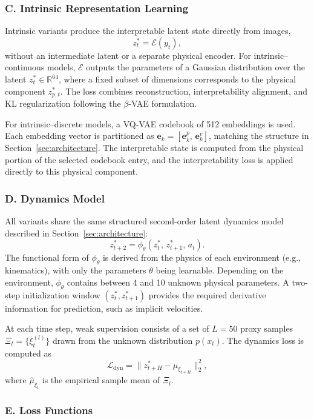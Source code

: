 \documentclass[nonacm,sigconf]{acmart}
\begin{document}
\subsubsection*{C. Intrinsic Representation Learning}

Intrinsic variants produce the interpretable latent state directly from images,
\[
z^*_t = \mathcal{E}(y_t),
\]
without an intermediate latent or a separate physical encoder.  
For intrinsic--continuous models, $\mathcal{E}$ outputs the parameters of a
Gaussian distribution over the latent $z^*_t \in \mathbb{R}^{64}$, where a fixed
subset of dimensions corresponds to the physical component $z^{*}_{p,t}$.  
The loss combines reconstruction, interpretability alignment, and KL
regularization following the $\beta$-VAE formulation.

For intrinsic--discrete models, a VQ-VAE codebook of 512 embeddings is used.
Each embedding vector is partitioned as
$\mathbf{e}_k = [\mathbf{e}^{p}_k,\, \mathbf{e}^{v}_k]$, matching the structure
in Section~\ref{sec:architecture}. The interpretable state is computed from the
physical portion of the selected codebook entry, and the interpretability loss is
applied directly to this physical component.

\subsubsection*{D. Dynamics Model}

All variants share the same structured second-order latent dynamics model
described in Section~\ref{sec:architecture}:
\[
z^{*}_{t+2} = \phi_\theta(z^{*}_{t},\, z^{*}_{t+1},\, a_t).
\]
The functional form of $\phi_\theta$ is derived from the physics of each
environment (e.g., kinematics), with only the parameters $\theta$ being
learnable. Depending on the environment, $\phi_\theta$ contains between 4 and 10
unknown physical parameters. A two-step initialization window
$(z^*_t, z^*_{t+1})$ provides the required derivative information for
prediction, such as implicit velocities.  

At each time step, weak supervision consists of a set of $L = 50$ proxy samples
$\Xi_t = \{\xi^{(l)}_t\}$ drawn from the unknown distribution $p(x_t)$. The
dynamics loss is computed as
\[
\mathcal{L}_{\text{dyn}} = 
\| z^{*}_{t+H} - \hat{\mu}_{\xi_{t+H}} \|_2^2,
\]
where $\hat{\mu}_{\xi_t}$ is the empirical sample mean of $\Xi_t$.

\subsubsection*{E. Loss Functions}
\end{document}

